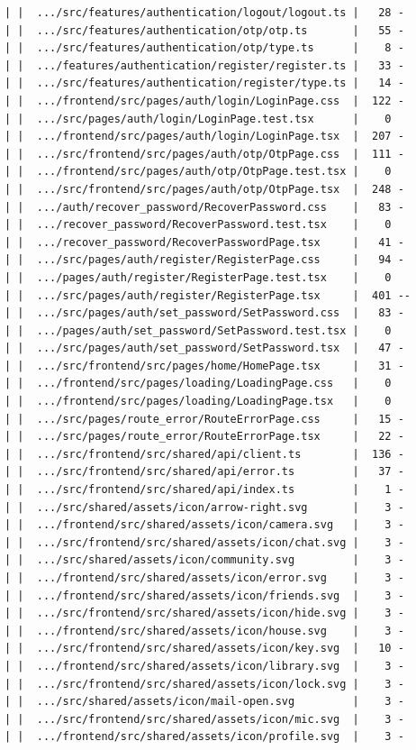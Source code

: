\documentclass[12pt]{article}
\begin{document}
\begin{lstlisting}[numbers=none,breaklines=true]
| |  .../src/features/authentication/logout/logout.ts |   28 -
| |  .../src/features/authentication/otp/otp.ts       |   55 -
| |  .../src/features/authentication/otp/type.ts      |    8 -
| |  .../features/authentication/register/register.ts |   33 -
| |  .../src/features/authentication/register/type.ts |   14 -
| |  .../frontend/src/pages/auth/login/LoginPage.css  |  122 -
| |  .../src/pages/auth/login/LoginPage.test.tsx      |    0
| |  .../frontend/src/pages/auth/login/LoginPage.tsx  |  207 -
| |  .../src/frontend/src/pages/auth/otp/OtpPage.css  |  111 -
| |  .../frontend/src/pages/auth/otp/OtpPage.test.tsx |    0
| |  .../src/frontend/src/pages/auth/otp/OtpPage.tsx  |  248 -
| |  .../auth/recover_password/RecoverPassword.css    |   83 -
| |  .../recover_password/RecoverPassword.test.tsx    |    0
| |  .../recover_password/RecoverPasswordPage.tsx     |   41 -
| |  .../src/pages/auth/register/RegisterPage.css     |   94 -
| |  .../pages/auth/register/RegisterPage.test.tsx    |    0
| |  .../src/pages/auth/register/RegisterPage.tsx     |  401 --
| |  .../src/pages/auth/set_password/SetPassword.css  |   83 -
| |  .../pages/auth/set_password/SetPassword.test.tsx |    0
| |  .../src/pages/auth/set_password/SetPassword.tsx  |   47 -
| |  .../src/frontend/src/pages/home/HomePage.tsx     |   31 -
| |  .../frontend/src/pages/loading/LoadingPage.css   |    0
| |  .../frontend/src/pages/loading/LoadingPage.tsx   |    0
| |  .../src/pages/route_error/RouteErrorPage.css     |   15 -
| |  .../src/pages/route_error/RouteErrorPage.tsx     |   22 -
| |  .../src/frontend/src/shared/api/client.ts        |  136 -
| |  .../src/frontend/src/shared/api/error.ts         |   37 -
| |  .../src/frontend/src/shared/api/index.ts         |    1 -
| |  .../src/shared/assets/icon/arrow-right.svg       |    3 -
| |  .../frontend/src/shared/assets/icon/camera.svg   |    3 -
| |  .../src/frontend/src/shared/assets/icon/chat.svg |    3 -
| |  .../src/shared/assets/icon/community.svg         |    3 -
| |  .../frontend/src/shared/assets/icon/error.svg    |    3 -
| |  .../frontend/src/shared/assets/icon/friends.svg  |    3 -
| |  .../src/frontend/src/shared/assets/icon/hide.svg |    3 -
| |  .../frontend/src/shared/assets/icon/house.svg    |    3 -
| |  .../src/frontend/src/shared/assets/icon/key.svg  |   10 -
| |  .../frontend/src/shared/assets/icon/library.svg  |    3 -
| |  .../src/frontend/src/shared/assets/icon/lock.svg |    3 -
| |  .../src/shared/assets/icon/mail-open.svg         |    3 -
| |  .../src/frontend/src/shared/assets/icon/mic.svg  |    3 -
| |  .../frontend/src/shared/assets/icon/profile.svg  |    3 -

\end{lstlisting}
\end{document}
